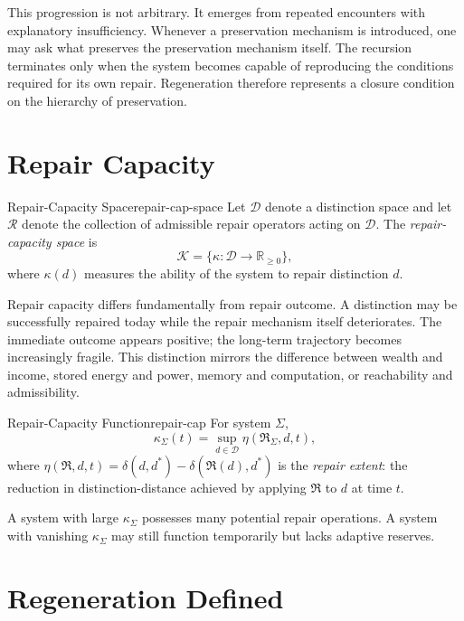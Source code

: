 \documentclass[12pt,twoside,openright]{book}
\newcommand{\repair}{\mathfrak{R}}
\begin{document}
This progression is not arbitrary. It emerges from repeated
encounters with explanatory insufficiency. Whenever a
preservation mechanism is introduced, one may ask what
preserves the preservation mechanism itself. The recursion
terminates only when the system becomes capable of
reproducing the conditions required for its own repair.
Regeneration therefore represents a closure condition on
the hierarchy of preservation.

\section{Repair Capacity}
\label{sec:ch11-capacity}

\begin{definition}{Repair-Capacity Space}{repair-cap-space}
  Let $\mathcal{D}$ denote a distinction space and let
  $\mathcal{R}$ denote the collection of admissible repair
  operators acting on $\mathcal{D}$. The
  \emph{repair-capacity space} is
  \[
    \mathcal{K} = \{\kappa : \mathcal{D} \to \mathbb{R}_{\ge0}\},
  \]
  where $\kappa(d)$ measures the ability of the system to
  repair distinction $d$.
\end{definition}

Repair capacity differs fundamentally from repair outcome.
A distinction may be successfully repaired today while the
repair mechanism itself deteriorates. The immediate outcome
appears positive; the long-term trajectory becomes
increasingly fragile. This distinction mirrors the
difference between wealth and income, stored energy and
power, memory and computation, or reachability and
admissibility.

\begin{definition}{Repair-Capacity Function}{repair-cap}
  For system $\Sigma$,
  \[
    \kappa_\Sigma(t) = \sup_{d\in\mathcal{D}} \eta(\repair_\Sigma,d,t),
  \]
  where $\eta(\repair,d,t) = \delta(d,d^*) - \delta(\repair(d),d^*)$
  is the \emph{repair extent}: the reduction in
  distinction-distance achieved by applying $\repair$ to
  $d$ at time $t$.
\end{definition}

A system with large $\kappa_\Sigma$ possesses many
potential repair operations. A system with vanishing
$\kappa_\Sigma$ may still function temporarily but lacks
adaptive reserves.

\section{Regeneration Defined}
\label{sec:ch11-defined}
\end{document}
